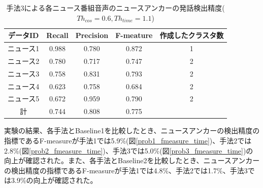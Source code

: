 \begin{table}[H]
  \begin{center}
    \caption{手法3による各ニュース番組音声のニュースアンカーの発話検出精度($Th_{cos}=0.6,Th_{time}=1.1$) \label{table:prob3_eachnews_time}}
    \begin{tabular}{|c||c|c|c|c|} \hline
データID & Recall & Precision & F-meature & 作成したクラスタ数\\ \hline
ニュース1 & 0.988 & 0.780 & 0.872 & 1 \\ \hline
ニュース2 & 0.780 & 0.717 & 0.747 & 2 \\ \hline
ニュース3 & 0.758 & 0.831 & 0.793 & 2 \\ \hline
ニュース4 & 0.623 & 0.758 & 0.684 & 2 \\ \hline
ニュース5 & 0.672 & 0.959 & 0.790 & 2 \\ \hline
計 & 0.744 & 0.808 & 0.775 & \\ \hline
    \end{tabular}
  \end{center}
\end{table}

実験の結果、各手法とBaseline1を比較したとき、ニュースアンカーの検出精度の指標であるF-measureが手法1では5.9\%(図\ref{prob1_fmeasure_time})、手法2では2.8\%(図\ref{prob2_fmeasure_time})、手法3では5.0\%(図\ref{prob3_fmeasure_time})の向上が確認された。また、各手法とBaseline2を比較したとき、ニュースアンカーの検出精度の指標であるF-measureが手法1では4.8\%、手法2では1.7\%、手法3では3.9\%の向上が確認された。